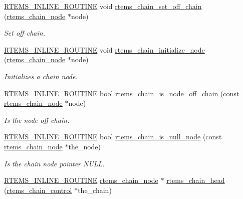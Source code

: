 \begin{DoxyCompactItemize}
\mbox{\hyperlink{group__RTEMSScoreBaseDefs_gac216239df231d5dbd15e3520b0b9313f}{R\+T\+E\+M\+S\+\_\+\+I\+N\+L\+I\+N\+E\+\_\+\+R\+O\+U\+T\+I\+NE}} void \mbox{\hyperlink{group__ClassicChains_gac98e310c0368fcc3555d8df13b36e31d}{rtems\+\_\+chain\+\_\+set\+\_\+off\+\_\+chain}} (\mbox{\hyperlink{structChain__Node__struct}{rtems\+\_\+chain\+\_\+node}} $\ast$node)
\begin{DoxyCompactList}\small\item\em Set off chain. \end{DoxyCompactList}\item 
\mbox{\hyperlink{group__RTEMSScoreBaseDefs_gac216239df231d5dbd15e3520b0b9313f}{R\+T\+E\+M\+S\+\_\+\+I\+N\+L\+I\+N\+E\+\_\+\+R\+O\+U\+T\+I\+NE}} void \mbox{\hyperlink{group__ClassicChains_ga8e0356d0c5f3efe5c26ddabfffe9f101}{rtems\+\_\+chain\+\_\+initialize\+\_\+node}} (\mbox{\hyperlink{structChain__Node__struct}{rtems\+\_\+chain\+\_\+node}} $\ast$node)
\begin{DoxyCompactList}\small\item\em Initializes a chain node. \end{DoxyCompactList}\item 
\mbox{\hyperlink{group__RTEMSScoreBaseDefs_gac216239df231d5dbd15e3520b0b9313f}{R\+T\+E\+M\+S\+\_\+\+I\+N\+L\+I\+N\+E\+\_\+\+R\+O\+U\+T\+I\+NE}} bool \mbox{\hyperlink{group__ClassicChains_gaea61e38fc8c358c07bde67ccfb95d207}{rtems\+\_\+chain\+\_\+is\+\_\+node\+\_\+off\+\_\+chain}} (const \mbox{\hyperlink{structChain__Node__struct}{rtems\+\_\+chain\+\_\+node}} $\ast$node)
\begin{DoxyCompactList}\small\item\em Is the node off chain. \end{DoxyCompactList}\item 
\mbox{\hyperlink{group__RTEMSScoreBaseDefs_gac216239df231d5dbd15e3520b0b9313f}{R\+T\+E\+M\+S\+\_\+\+I\+N\+L\+I\+N\+E\+\_\+\+R\+O\+U\+T\+I\+NE}} bool \mbox{\hyperlink{group__ClassicChains_ga55175f3e42d62a6b7214f3d830f07d0a}{rtems\+\_\+chain\+\_\+is\+\_\+null\+\_\+node}} (const \mbox{\hyperlink{structChain__Node__struct}{rtems\+\_\+chain\+\_\+node}} $\ast$the\+\_\+node)
\begin{DoxyCompactList}\small\item\em Is the chain node pointer N\+U\+LL. \end{DoxyCompactList}\item 
\mbox{\hyperlink{group__RTEMSScoreBaseDefs_gac216239df231d5dbd15e3520b0b9313f}{R\+T\+E\+M\+S\+\_\+\+I\+N\+L\+I\+N\+E\+\_\+\+R\+O\+U\+T\+I\+NE}} \mbox{\hyperlink{structChain__Node__struct}{rtems\+\_\+chain\+\_\+node}} $\ast$ \mbox{\hyperlink{group__ClassicChains_gaa709c9ad42e0c2f3c89f7e31f1b49748}{rtems\+\_\+chain\+\_\+head}} (\mbox{\hyperlink{unionChain__Control}{rtems\+\_\+chain\+\_\+control}} $\ast$the\+\_\+chain)

\end{DoxyCompactItemize}
